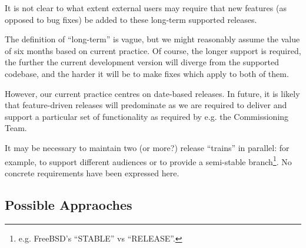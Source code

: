 \documentclass[letterpaper]{scrartcl}
\begin{document}
It is not clear to what extent external users may require that new features
(as opposed to bug fixes) be added to these long-term supported releases.

The definition of ``long-term'' is vague, but we might reasonably assume the
value of six months based on current practice. Of course, the longer support
is required, the further the current development version will diverge from the
supported codebase, and the harder it will be to make fixes which apply to
both of them.

However, our current practice centres on date-based releases. In future, it
is likely that feature-driven releases will predominate as we are required to
deliver and support a particular set of functionality as required by e.g. the
Commissioning Team.

It may be necessary to maintain two (or more?) release ``trains'' in parallel:
for example, to support different audiences or to provide a semi-stable
branch\footnote{e.g. FreeBSD's ``STABLE'' vs ``RELEASE''.}. No concrete
requirements have been expressed here.

\subsection{Possible Appraoches}
\end{document}
